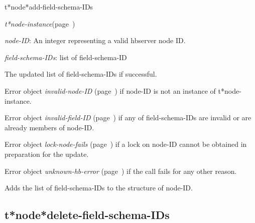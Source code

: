 \begin{description}
\item [Name:]  t*node*add-field-schema-IDs

\item [Class:] {\sl t*node-instance}\hfill(page~\pageref{t*node-instance})

\item [Parameters:]
\item {\sl node-ID}:   An integer representing
a valid hbserver node ID.

\item {\sl field-schema-IDs}:  list of field-schema-ID


\item [Return-value:]
The updated list of field-schema-IDs if successful.

Error object {\sl invalid-node-ID} (page~\pageref{invalid-node-ID}) if node-ID is not an
instance of t*node-instance.

Error object {\sl invalid-field-ID} (page~\pageref{invalid-field-ID}) if any of 
field-schema-IDs are invalid or are already members of 
node-ID.

Error object {\sl lock-node-fails} (page~\pageref{lock-node-fails}) if a lock on node-ID
cannot be obtained in preparation for the update.

Error object {\sl unknown-hb-error} (page~\pageref{unknown-hb-error}) if the call fails
for any other reason. 

\item [Description:]

Adds the list of field-schema-IDs to the structure of
node-ID.

\item [Public:]



\end{description}
\horizontalline

\subsection{t*node*delete-field-schema-IDs}
\label{t*node*delete-field-schema-IDs}


